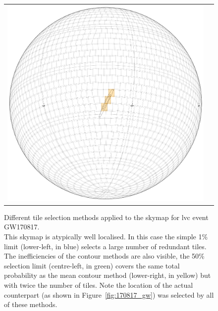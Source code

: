 \begin{colsection}
\begin{colsection}
\begin{figure}[p]
\begin{center}
\begin{tabular}{cc}
\includegraphics[width=0.25\linewidth]{images/tiling/2_b.png}
\\

\end{tabular}
\end{center}
\caption[Different tile selection methods for GW170817]{Different tile selection methods applied to the skymap for \gls{lvc} event GW170817.\\
This skymap is atypically well localised. In this case the simple 1\% limit (lower-left, in blue) selects a large number of redundant tiles. The inefficiencies of the contour methods are also visible, the 50\% selection limit (centre-left, in green) covers the same total probability as the mean contour method (lower-right, in yellow) but with twice the number of tiles. Note the location of the actual counterpart (as shown in Figure~\ref{fig:170817_gw}) was selected by all of these methods.
}
\label{fig:tiling_GW170817}
\end{figure}



\end{colsection}
\end{colsection}
